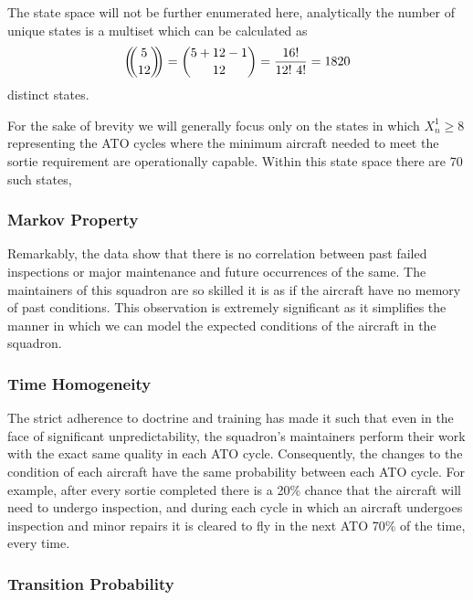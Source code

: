 \documentclass[12pt]{amsart}
\begin{document}
The state space will not be further enumerated here, analytically the 
number of unique states is a multiset which can be calculated as
\begin{align}
	\left( \hspace{-0.4em} \binom{5}{12} \hspace{-0.4em} \right) 
	=\binom{5+12-1}{12}
	=\frac{16!}{12!\ 4!}
	= 1820
\end{align}
distinct states.

For the sake of brevity we will generally focus only on the states in which
\(X_n^1\geq8\) representing the ATO cycles where the minimum aircraft
needed to meet the sortie requirement are operationally capable.
Within this state space there are 70 such states,

\subsubsection{Markov Property}

Remarkably, the data show that there is no correlation between past failed
inspections or major maintenance and future occurrences of the same.
The maintainers of this squadron are so skilled it is as if the 
aircraft have no memory of past conditions.
This observation is extremely significant as it simplifies the manner 
in which we can model the expected conditions of the aircraft in the squadron.

\subsubsection{Time Homogeneity}

The strict adherence to doctrine and training has made it such that 
even in the face of significant unpredictability,
the squadron's maintainers perform their work with the exact
same quality in each ATO cycle.
Consequently, the changes to the condition of each aircraft have the 
same probability between each ATO cycle. 
For example, after every sortie completed there is a 20\% chance that
the aircraft will need to undergo inspection, and during each 
cycle in which an aircraft undergoes inspection and minor repairs
it is cleared to fly in the next ATO 70\% of the time, every time.

\subsubsection{Transition Probability}
\end{document}
